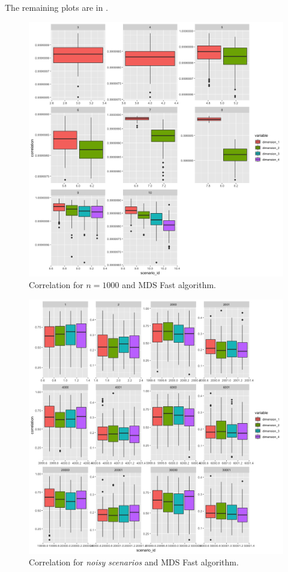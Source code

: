 \documentclass[11pt]{report}
\begin{document}
The remaining plots are in .


\begin{figure}[ht]
\centering
    \includegraphics{./images/fast_correlation_1000.png}
    \caption{Correlation for $n = 1000$ and MDS Fast algorithm.}
    \label{fast_correlation_1000}
\end{figure}

\begin{figure}[ht]
\centering
    \includegraphics{./images/fast_correlation_noise.png}
    \caption{Correlation for \textit{noisy scenarios} and MDS Fast algorithm.}
    \label{fast_correlation_noise}
\end{figure}
\end{document}
